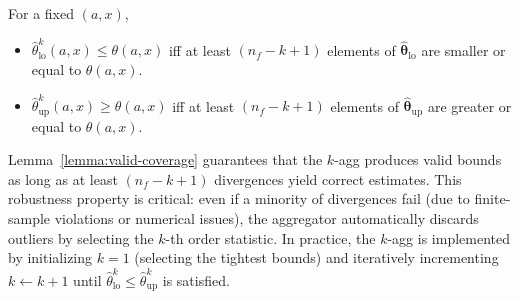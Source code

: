 \begin{lemma}\label{lemma:valid-coverage}
    \normalfont
    For a fixed $(a,x)$, 
    \begin{itemize}[leftmargin=*]
        \item $\widehat{\theta}^{k}_{\mathrm{lo}}(a,x) \le \theta(a,x)$ iff at least $(n_f - k + 1)$ elements of $\widehat{\boldsymbol{\theta}}_{\mathrm{lo}}$ are smaller or equal to $\theta(a,x)$. 
        \item $\widehat{\theta}^{k}_{\mathrm{up}}(a,x) \ge \theta(a,x)$ iff at least $(n_f - k + 1)$ elements of $\widehat{\boldsymbol{\theta}}_{\mathrm{up}}$ are greater or equal to $\theta(a,x)$. 
    \end{itemize}
\end{lemma}
Lemma~\ref{lemma:valid-coverage} guarantees that the $k$-agg produces valid bounds as long as at least $(n_f - k + 1)$ divergences yield correct estimates. This robustness property is critical: even if a minority of divergences fail (due to finite-sample violations or numerical issues), the aggregator automatically discards outliers by selecting the $k$-th order statistic. In practice, the $k$-agg is implemented by initializing $k = 1$ (selecting the tightest bounds) and iteratively incrementing $k \leftarrow k+1 $ until $\widehat{\theta}^{k}_\mathrm{lo} \leq \widehat{\theta}^{k}_{\mathrm{up}}$ is satisfied.  


